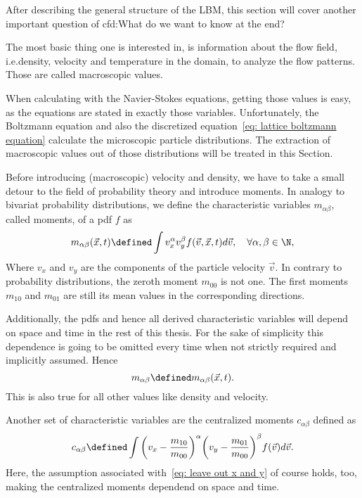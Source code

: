After describing the general structure of the LBM, this section will cover another important question of \gls{cfd}:\@ What do we want to know at the end?

The most basic thing one is interested in, is information about the flow field, i.e.\@ density, velocity and temperature in the domain, to analyze the flow patterns.
Those are called macroscopic values.

When calculating with the Navier-Stokes equations, getting those values is easy, as the equations are stated in exactly those variables.
Unfortunately, the Boltzmann equation and also the discretized equation~\eqref{eq: lattice boltzmann equation} calculate the microscopic particle distributions.
The extraction of macroscopic values out of those distributions will be treated in this Section.

Before introducing (macroscopic) velocity and density, we have to take a small detour to the field of probability theory and introduce moments.
In analogy to bivariat probability distributions, we define the characteristic variables $m_{\alpha\beta}$, called moments, of a \gls{pdf} $f$ as
\begin{equation}
  \label{eq: moments continuous}
  m_{\alpha\beta}(\vec{x},t) \defined  \int v_x^\alpha v_y^\beta f(\vec{v},\vec{x},t) d\vec{v},\quad\forall\alpha,\beta\in\N,
\end{equation}
Where $v_x$ and $v_y$ are the components of the particle velocity $\vec{v}$.
In contrary to probability distributions, the zeroth moment $m_{00}$ is not one. The first moments $m_{10}$ and $m_{01}$ are still its mean values in the corresponding directions.

Additionally, the \glspl{pdf} and hence all derived characteristic variables will depend on space and time in the rest of this thesis. For the sake of simplicity this dependence is going to be omitted every time when not strictly required and implicitly assumed. Hence
\begin{equation}
  \label{eq: leave out x and y}
  m_{\alpha\beta} \defined m_{\alpha\beta}(\vec{x},t).
\end{equation}
This is also true for all other values like density and velocity.

Another set of characteristic variables are the centralized moments $c_{\alpha\beta}$ defined as
\begin{equation}
  \label{eq: central moments continuous}
  c_{\alpha\beta} \defined \int {\left(v_x - \frac{m_{10}}{m_{00}}\right)}^\alpha {\left(v_y-\frac{m_{01}}{m_{00}}\right)}^\beta f(\vec{v})  d\vec{v}.
\end{equation}
Here, the assumption associated with~\eqref{eq: leave out x and y} of course holds, too, making the centralized moments dependend on space and time.

